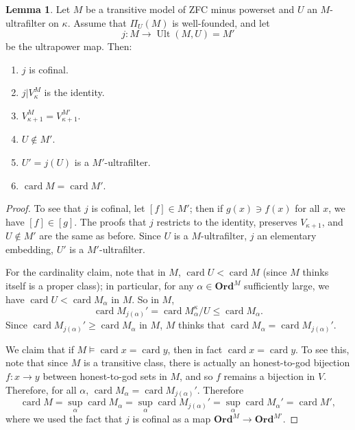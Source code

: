 \documentclass[12pt]{report}
\newcommand{\card}{\operatorname{card}}
\newcommand{\Ord}{\mathbf{Ord}}
\DeclareMathOperator{\Ult}{Ult}
\theoremstyle{definition}
\newtheorem{lemma}[theorem]{Lemma}
\begin{document}
\begin{lemma}
Let $M$ be a transitive model of ZFC minus powerset and $U$ an $M$-ultrafilter on $\kappa$. Assume that $\Pi_U(M)$ is well-founded, and let
$$j: M \to \Ult(M, U) = M'$$
be the ultrapower map. Then:
\begin{enumerate}
\item $j$ is cofinal.
\item $j|V_\kappa^M$ is the identity.
\item $V_{\kappa+1}^M = V_{\kappa+1}^{M'}$.
\item $U \notin M'$.
\item $U' = j(U)$ is a $M'$-ultrafilter.
\item $\card M = \card M'$.
\end{enumerate}
\end{lemma}
\begin{proof}
To see that $j$ is cofinal, let $[f] \in M'$; then if $g(x) \ni f(x)$ for all $x$, we have $[f] \in [g]$.
The proofs that $j$ restricts to the identity, preserves $V_{\kappa+1}$, and $U \notin M'$ are the same as before.
Since $U$ is a $M$-ultrafilter, $j$ an elementary embedding, $U'$ is a $M'$-ultrafilter.

For the cardinality claim, note that in $M$, $\card U < \card M$ (since $M$ thinks itself is a proper class); in particular, for any $\alpha \in \Ord^M$ sufficiently large, we have $\card U < \card M_\alpha$ in $M$.
So in $M$,
$$\card M_{j(\alpha)}' = \card M_\alpha^\kappa/U \leq \card M_\alpha.$$
Since $\card M_{j(\alpha)}' \geq \card M_\alpha$ in $M$, $M$ thinks that $\card M_\alpha = \card M_{j(\alpha)}'$.

We claim that if $M \models \card x = \card y$, then in fact $\card x = \card y$. To see this, note that since $M$ is a transitive class, there is actually an honest-to-god bijection $f: x \to y$ between honest-to-god sets in $M$, and so $f$ remains a bijection in $V$. Therefore, for all $\alpha$, $\card M_\alpha = \card M_{j(\alpha)}'$. Therefore
$$\card M = \sup_\alpha \card M_\alpha = \sup_\alpha \card M_{j(\alpha)}' = \sup_\alpha \card M_\alpha' = \card M',$$
where we used the fact that $j$ is cofinal as a map $\Ord^M \to \Ord^{M'}$.
\end{proof}
\end{document}
